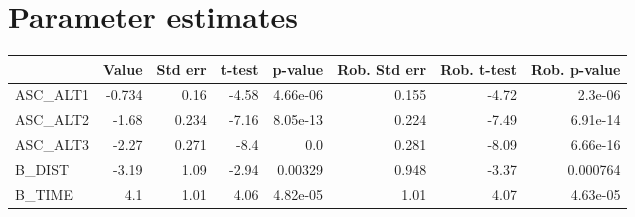 \section{Parameter estimates}
\begin{tabular}{lrrrrrrr}
\toprule
{} &  Value &  Std err &  t-test &  p-value &  Rob. Std err &  Rob. t-test &  Rob. p-value \\
\midrule
ASC\_ALT1 & -0.734 &     0.16 &   -4.58 & 4.66e-06 &         0.155 &        -4.72 &       2.3e-06 \\
ASC\_ALT2 &  -1.68 &    0.234 &   -7.16 & 8.05e-13 &         0.224 &        -7.49 &      6.91e-14 \\
ASC\_ALT3 &  -2.27 &    0.271 &    -8.4 &      0.0 &         0.281 &        -8.09 &      6.66e-16 \\
B\_DIST   &  -3.19 &     1.09 &   -2.94 &  0.00329 &         0.948 &        -3.37 &      0.000764 \\
B\_TIME   &    4.1 &     1.01 &    4.06 & 4.82e-05 &          1.01 &         4.07 &      4.63e-05 \\
\bottomrule
\end{tabular}

